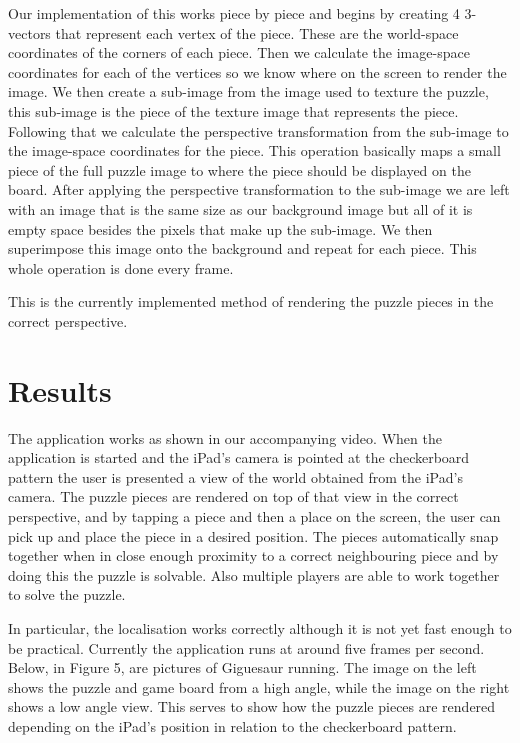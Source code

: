 \documentclass{article}
\begin{document}
Our implementation of this works piece by piece and begins by creating 4 3-vectors that represent each vertex of the piece. These are the world-space coordinates of the corners of each piece. Then we calculate the image-space coordinates for each of the vertices so we know where on the screen to render the image. We then create a sub-image from the image used to texture the puzzle, this sub-image is the piece of the texture image that represents the piece. Following that we calculate the perspective transformation from the sub-image to the image-space coordinates for the piece. This operation basically maps a small piece of the full puzzle image to where the piece should be displayed on the board. After applying the perspective transformation to the sub-image we are left with an image that is the same size as our background image but all of it is empty space besides the pixels that make up the sub-image. We then superimpose this image onto the background and repeat for each piece. This whole operation is done every frame. 

This is the currently implemented method of rendering the puzzle pieces in the correct perspective.

\section{Results}

The application works as shown in our accompanying video. When the application is started and the iPad's camera is pointed at the checkerboard pattern the user is presented a view of the world obtained from the iPad's camera. The puzzle pieces are rendered on top of that view in the correct perspective, and by tapping a piece and then a place on the screen, the user can pick up and place the piece in a desired position. The pieces automatically snap together when in close enough proximity to a correct neighbouring piece and by doing this the puzzle is solvable. Also multiple players are able to work together to solve the puzzle. 

In particular, the localisation works correctly although it is not yet fast enough to be practical. Currently the application runs at around five frames per second. Below, in Figure 5, are pictures of Giguesaur running. The image on the left shows the puzzle and game board from a high angle, while the image on the right shows a low angle view. This serves to show how the puzzle pieces are rendered depending on the iPad's position in relation to the checkerboard pattern. 
\end{document}
